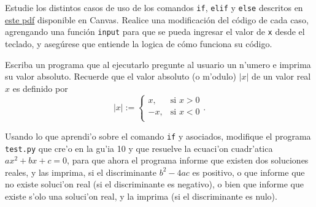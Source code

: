 \documentclass[11pt]{exam}
\begin{document}
\begin{questions}
%

\item Estudie los distintos casos de uso de los comandos \texttt{if}, \texttt{elif} y \texttt{else} descritos en \href{https://udec.instructure.com/courses/17852/files/folder/Python?preview=1040768}{este pdf} disponible en Canvas. Realice una modificación del código de cada caso, agrengando una función \texttt{input} para que se pueda ingresar el valor de \texttt{x} desde el teclado, y asegúrese que entiende la logica de cómo funciona su código.

\item Escriba un programa que al ejecutarlo pregunte al usuario un n'umero e imprima su valor absoluto. Recuerde que el valor absoluto (o m'odulo) $|x|$ de un valor real $x$ es definido por
\begin{equation}
|x|:=\left\{\begin{array}{cl}
x, &\text{si } x>0 \\
-x, & \text{si } x<0 \\
\end{array}\right. .
\end{equation}

\item Usando lo que aprendi'o sobre el comando \texttt{if} y asociados, modifique el programa \texttt{test.py} que cre'o en la gu'ia 10 y que resuelve la ecuaci'on cuadr'atica $ax^2+bx+c=0$, para que ahora el programa informe que existen dos soluciones reales, y las imprima, si el discriminante $b^2-4ac$ es positivo, o que informe que no existe soluci'on real (si el discriminante es negativo), o bien que informe que existe s'olo una soluci'on real, y la imprima (si el discriminante es nulo).


\end{questions}
\end{document}
